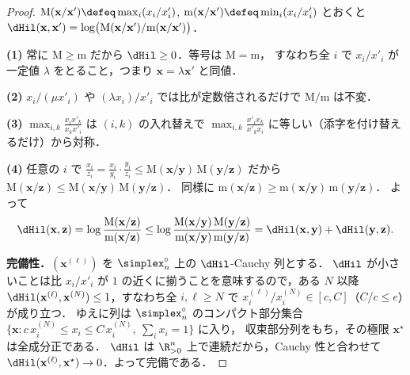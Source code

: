 \begin{proof}
  $\mathrm{M}(\mathbf{x}/\mathbf{x}') \defeq \max_i (x_i/x'_i)$,
  $\mathrm{m}(\mathbf{x}/\mathbf{x}') \defeq \min_i (x_i/x'_i)$ とおくと
  $\dHil(\mathbf{x}, \mathbf{x}') = \log\bigl(\mathrm{M}(\mathbf{x}/\mathbf{x}') / \mathrm{m}(\mathbf{x}/\mathbf{x}')\bigr)$．

  \textbf{(1)} 常に $\mathrm{M} \geq \mathrm{m}$ だから $\dHil \geq 0$．等号は $\mathrm{M} = \mathrm{m}$，
  すなわち全 $i$ で $x_i/x'_i$ が一定値 $\lambda$ をとること，つまり $\mathbf{x} = \lambda\mathbf{x}'$ と同値．

  \textbf{(2)} $x_i/(\mu x'_i)$ や $(\lambda x_i)/x'_i$ では比が定数倍されるだけで
  $\mathrm{M}/\mathrm{m}$ は不変．

  \textbf{(3)} $\max_{i,k}\frac{x_i x'_k}{x_k x'_i}$ は $(i,k)$ の入れ替えで
  $\max_{i,k}\frac{x'_i x_k}{x'_k x_i}$ に等しい（添字を付け替えるだけ）から対称．

  \textbf{(4)} 任意の $i$ で $\frac{x_i}{z_i} = \frac{x_i}{y_i}\cdot\frac{y_i}{z_i}
  \leq \mathrm{M}(\mathbf{x}/\mathbf{y})\,\mathrm{M}(\mathbf{y}/\mathbf{z})$ だから
  $\mathrm{M}(\mathbf{x}/\mathbf{z}) \leq \mathrm{M}(\mathbf{x}/\mathbf{y})\,\mathrm{M}(\mathbf{y}/\mathbf{z})$．
  同様に $\mathrm{m}(\mathbf{x}/\mathbf{z}) \geq \mathrm{m}(\mathbf{x}/\mathbf{y})\,\mathrm{m}(\mathbf{y}/\mathbf{z})$．
  よって
  \[
    \dHil(\mathbf{x}, \mathbf{z})
    = \log\frac{\mathrm{M}(\mathbf{x}/\mathbf{z})}{\mathrm{m}(\mathbf{x}/\mathbf{z})}
    \leq \log\frac{\mathrm{M}(\mathbf{x}/\mathbf{y})\,\mathrm{M}(\mathbf{y}/\mathbf{z})}
                  {\mathrm{m}(\mathbf{x}/\mathbf{y})\,\mathrm{m}(\mathbf{y}/\mathbf{z})}
    = \dHil(\mathbf{x}, \mathbf{y}) + \dHil(\mathbf{y}, \mathbf{z}).
  \]

  \textbf{完備性．}$(\mathbf{x}^{(\ell)})$ を $\simplex_n^\circ$ 上の $\dHil$-Cauchy 列とする．
  $\dHil$ が小さいことは比 $x_i/x'_i$ が $1$ の近くに揃うことを意味するので，ある $N$ 以降
  $\dHil(\mathbf{x}^{(\ell)}, \mathbf{x}^{(N)}) \leq 1$，すなわち全 $i, \ell\geq N$ で
  $x_i^{(\ell)} / x_i^{(N)} \in [c, C]$（$C/c \leq e$）が成り立つ．
  ゆえに列は $\simplex_n^\circ$ のコンパクト部分集合
  $\{\mathbf{x} : c\,x_i^{(N)} \leq x_i \leq C\,x_i^{(N)},\ \sum_i x_i = 1\}$ に入り，
  収束部分列をもち，その極限 $\mathbf{x}^\star$ は全成分正である．
  $\dHil$ は $\R_{>0}^n$ 上で連続だから，Cauchy 性と合わせて
  $\dHil(\mathbf{x}^{(\ell)}, \mathbf{x}^\star) \to 0$．よって完備である．
\end{proof}

